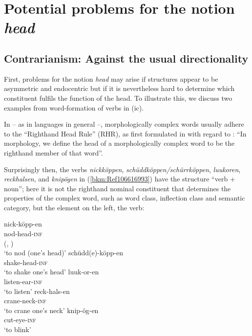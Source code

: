 \documentclass[output=paper
  ,nobabel
  ,draftmode
  ,colorlinks, citecolor=brown
]{langscibook}
\begin{document}
\section{Potential problems for the notion \emph{head}}

\subsection{Contrarianism: Against the usual directionality} 

First, problems for the notion \emph{head} may arise if structures appear to be asymmetric and
endocentric but if it is nevertheless hard to determine which constituent fulfils the function of
the head. To illustrate this, we discuss two examples from word-formation of verbs in (ic).

In  – as in  languages in general –, morphologically complex words usually adhere to
the ``Righthand Head Rule'' (RHR), as first formulated in \citet[248]{Williams1981} with regard to
: “In morphology, we define the head of a morphologically complex word to be the righthand
member of that word''.

\largerpage
Surprisingly then, the  verbs \emph{nickköppen}, \emph{schüddköppen/schürrköppen},
\emph{luukoren}, \emph{reckhalsen}, and \emph{knipögen} in (\ref{bkm:Ref106616993}) have the
structure “verb + noun''; here it is not the righthand nominal constituent that determines the
properties of the complex word, such as word class, inflection class and semantic category, but the
element on the left, the verb:

\eal
\label{bkm:Ref106388120}\label{bkm:Ref106616993}
\ex
\gll nick-köpp-en\\
     nod-head-\textsc{inf} \\\hfill(, \citealt[50--52]{AsdahlHolmberg1973})\\
\glt `to nod (one's head)'
\ex
\gll schüdd(e)-köpp-en\\
     shake-head-\textsc{inf} \\
\glt `to shake one's head'
\ex
\gll luuk-or-en\\
       listen-ear-\textsc{inf} \\
\glt   `to listen'
\ex 
\gll reck-hals-en\\
       crane-neck-\textsc{inf} \\
\glt   `to crane one's neck'
\ex
\gll knip-ög-en\\
       cut-eye-\textsc{inf} \\
\glt   `to blink'
\zl
\end{document}

